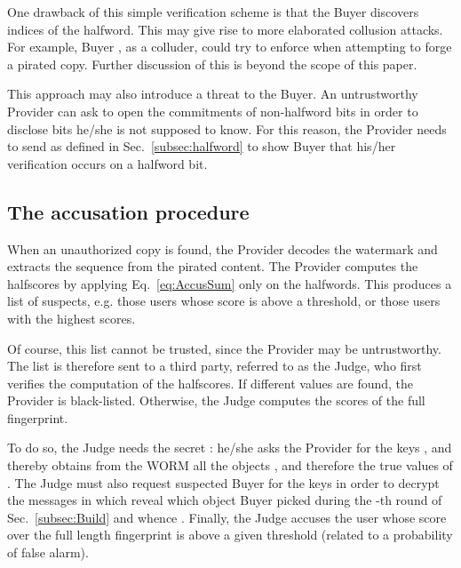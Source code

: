 \documentclass{article}
\begin{document}
One drawback of this simple verification scheme
is that the Buyer discovers  indices of the halfword. This may
give rise to more elaborated collusion attacks.  For example, Buyer , as a
colluder, could try to
enforce  when attempting to forge a pirated
copy.  Further discussion of this is beyond the scope of this paper.

This approach may also introduce a threat to the Buyer.  An untrustworthy Provider can ask to open
the commitments of non-halfword bits in order to disclose bits he/she
is not supposed to know. For this reason, the Provider needs to send
 as defined in
Sec.~\ref{subsec:halfword} to show Buyer  that his/her verification occurs on a halfword bit.

\subsection{The accusation procedure}
\label{sec:Accuse}

When an unauthorized copy is found, 
the  Provider decodes the watermark and extracts the sequence
 from the pirated content. The Provider computes the
halfscores by applying Eq.~\eqref{eq:AccusSum} only on the
halfwords. This produces a list of suspects, e.g. those users whose score
is above a threshold, or those users with the highest scores.  




Of course, this list cannot be trusted, since the Provider may be
untrustworthy.   
The list is therefore sent to a third party, referred to as the Judge,  who first verifies the computation of
the halfscores. 
If different values are found, the Provider is
black-listed. Otherwise, the Judge computes the scores of the full
fingerprint.

To do so, the Judge needs the secret : he/she
asks the Provider for the keys ,  and thereby obtains from the WORM all the objects
, and therefore the true values of . 
The Judge must also request suspected Buyer  for the keys 
in order to decrypt the messages  in  which
reveal which object Buyer  picked during the -th round of
Sec.~\ref{subsec:Build} and whence . 
Finally, the Judge
accuses the user whose score over the full length fingerprint is above a
given threshold (related to a probability of false alarm).
\end{document}
